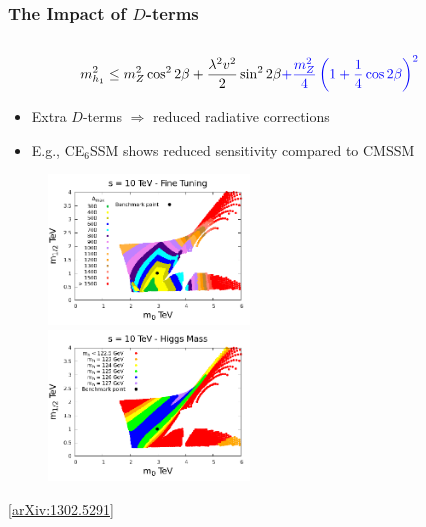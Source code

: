 \documentclass[10pt,aspectratio=169]{beamer}
\begin{document}
\begin{frame}
  \frametitle{The Impact of $D$-terms}
  \begin{columns}[t]
    \begin{column}{0.5\textwidth}
      { \small
      \begin{equation*}
        m_{h_1}^2 \leq m_Z^2 \cos^2 2\beta + \frac{\lambda^2 v^2}{2}
        \sin^2 2\beta {\color{blue} + \frac{m_Z^2}{4} \left (1 + \frac{1}{4}
        \cos 2\beta \right )^2}
      \end{equation*}}
      \begin{itemize} \itemsep1em
        \item Extra $D$-terms $\Rightarrow$ reduced radiative corrections
        \item E.g., CE$_6$SSM shows reduced sensitivity compared to CMSSM
      \end{itemize}
      \begin{figure}
        \centering
        \includegraphics[width=0.5\textwidth]{ce6ssm_tuning}
        \includegraphics[width=0.5\textwidth]{ce6ssm_higgs_mass}
      \end{figure}
      \vspace*{-25pt}
      \begin{center}
        {\tiny [\href{https://arxiv.org/abs/1302.5291}{arXiv:1302.5291}]}
      \end{center}
    \end{column}
    \begin{column}{0.5\textwidth}
      { \small
      \begin{equation*}

\end{equation*}}
\end{column}
\end{columns}
\end{frame}
\end{document}
